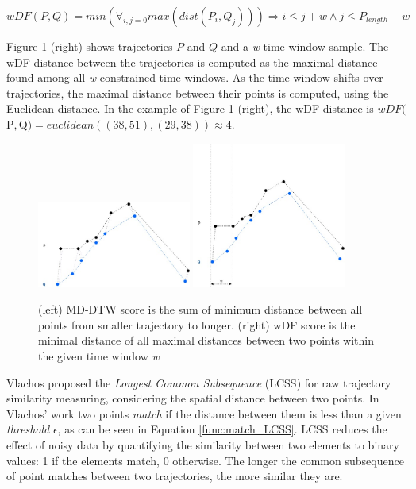 \documentclass[12pt]{article}
\begin{document}
\begin{equation}
\label{func:match_wDF}
  wDF(P, Q) = min(\forall_{i,j=0}max(dist(P_i, Q_j))) \Rightarrow i \leq j + w \land
  j \leq P_{length} - w
\end{equation}

Figure \ref{fig:related_trajes_wDF_DTW} (right) shows trajectories $P$ and $Q$ and a \emph{w} time-window sample. The wDF distance between the trajectories is computed as the maximal distance found among all \emph{w}-constrained time-windows. As the time-window shifts over trajectories, the maximal distance between their points is computed, using the Euclidean distance. In the example of Figure \ref{fig:related_trajes_wDF_DTW} (right), the wDF distance is $wDF($P$, $Q$) = euclidean((38,51), (29,38)) \approx 4$.

\begin{figure}[h]
\centering
\includegraphics[width=0.45\textwidth]{Related_Works/related_trajes-DTW.jpg}
\includegraphics[width=0.45\textwidth]{Related_Works/related_trajes-wDF.jpg}
\caption{\label{fig:related_trajes_wDF_DTW}(left) MD-DTW score is the sum of minimum distance between all points from smaller trajectory to longer. (right) wDF score is the minimal distance of all maximal distances between two points within the given time window \textit{w}}
\end{figure}

Vlachos \cite{vlachos2002discovering} proposed the \emph{Longest Common Subsequence} (LCSS) for raw trajectory similarity measuring, considering the spatial distance between two points. In Vlachos' work two points \textit{match} if the distance between them is less than a given \textit{threshold} $\epsilon$, as can be seen in Equation \ref{func:match_LCSS}. LCSS reduces the effect of noisy data by quantifying the similarity between two elements to binary values: 1 if the elements match, 0 otherwise. The longer the common subsequence of point matches between two trajectories, the more similar they are. 
\end{document}
